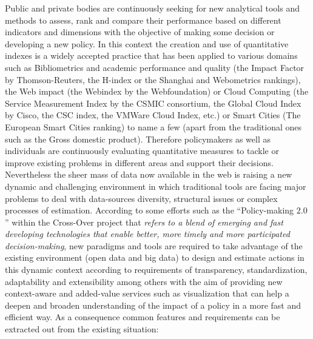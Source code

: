Public and private bodies are continuously seeking for new analytical tools and methods to assess, rank and compare their performance based 
on different indicators and dimensions with the objective of making some decision or developing a new policy. 
In this context the creation and use of quantitative indexes is a widely accepted practice that has been applied to various 
domains such as Bibliometrics and academic performance and quality (the Impact Factor by Thomson-Reuters, the H-index or the Shanghai and Webometrics rankings), 
the Web impact (the Webindex by the Webfoundation) or Cloud Computing (the Service Measurement Index by the CSMIC consortium, the Global Cloud Index by Cisco, 
the CSC index, the VMWare Cloud Index, etc.) or Smart Cities (The European Smart Cities ranking) to name a few (apart from the traditional ones such as the Gross domestic product). 
Therefore policymakers as well as individuals are continuously evaluating quantitative measures to tackle or improve 
existing problems in different areas and support their decisions. Nevertheless the sheer mass of data now available in the web is 
raising a new dynamic and challenging environment in which traditional tools are facing major 
problems to deal with data-sources diversity, structural issues or complex processes of estimation. According to some efforts 
such as the ``Policy-making $2.0$'' within the Cross-Over project that \textit{refers to a blend of emerging and fast developing technologies 
that enable better, more timely and more participated decision-making}, new paradigms and tools are required to take advantage of 
the existing environment (open data and big data) to design and estimate actions in this dynamic context according to requirements of 
transparency, standardization, adaptability and extensibility among others with the aim of providing new context-aware 
and added-value services such as visualization that can help a deepen and broaden understanding of the impact of a 
policy in a more fast and efficient way. As a consequence common features and requirements can be extracted out from the existing situation:
